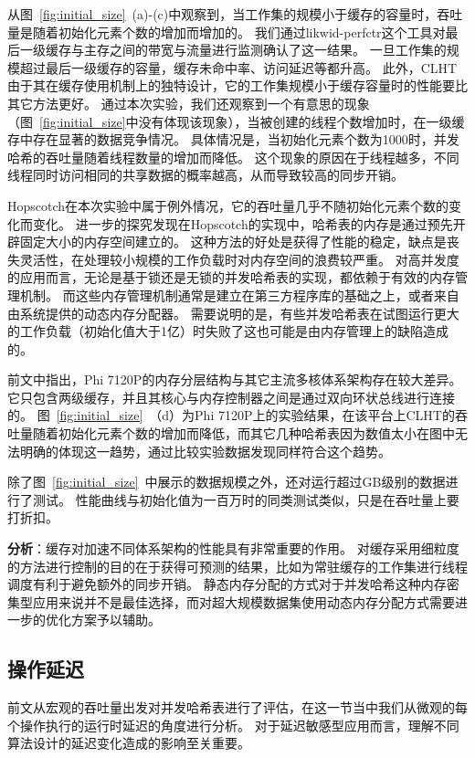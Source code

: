 从图~\ref{fig:initial_size}~(a)-(c)中观察到，当工作集的规模小于缓存的容量时，吞吐量是随着初始化元素个数的增加而增加的。
我们通过likwid-perfctr这个工具对最后一级缓存与主存之间的带宽与流量进行监测确认了这一结果。
一旦工作集的规模超过最后一级缓存的容量，缓存未命中率、访问延迟等都升高。
此外，CLHT由于其在缓存使用机制上的独特设计，它的工作集规模小于缓存容量时的性能要比其它方法更好。
通过本次实验，我们还观察到一个有意思的现象（图~\ref{fig:initial_size}中没有体现该现象），当被创建的线程个数增加时，在一级缓存中存在显著的数据竞争情况。
具体情况是，当初始化元素个数为1000时，并发哈希的吞吐量随着线程数量的增加而降低。
这个现象的原因在于线程越多，不同线程同时访问相同的共享数据的概率越高，从而导致较高的同步开销。

Hopscotch在本次实验中属于例外情况，它的吞吐量几乎不随初始化元素个数的变化而变化。
进一步的探究发现在Hopscotch的实现中，哈希表的内存是通过预先开辟固定大小的内存空间建立的。
这种方法的好处是获得了性能的稳定，缺点是丧失灵活性，在处理较小规模的工作负载时对内存空间的浪费较严重。
对高并发度的应用而言，无论是基于锁还是无锁的并发哈希表的实现，都依赖于有效的内存管理机制。
而这些内存管理机制通常是建立在第三方程序库的基础之上，或者来自由系统提供的动态内存分配器。
需要说明的是，有些并发哈希表在试图运行更大的工作负载（初始化值大于1亿）时失败了这也可能是由内存管理上的缺陷造成的。

前文中指出，Phi 7120P的内存分层结构与其它主流多核体系架构存在较大差异。
它只包含两级缓存，并且其核心与内存控制器之间是通过双向环状总线进行连接的。
图~\ref{fig:initial_size}~（d）为Phi 7120P上的实验结果，在该平台上CLHT的吞吐量随着初始化元素个数的增加而降低，而其它几种哈希表因为数值太小在图中无法明确的体现这一趋势，通过比较实验数据发现同样符合这个趋势。

除了图~\ref{fig:initial_size}~中展示的数据规模之外，还对运行超过GB级别的数据进行了测试。
性能曲线与初始化值为一百万时的同类测试类似，只是在吞吐量上要打折扣。

\textbf{分析}：缓存对加速不同体系架构的性能具有非常重要的作用。
对缓存采用细粒度的方法进行控制的目的在于获得可预测的结果，比如为常驻缓存的工作集进行线程调度有利于避免额外的同步开销。
静态内存分配的方式对于并发哈希这种内存密集型应用来说并不是最佳选择，而对超大规模数据集使用动态内存分配方式需要进一步的优化方案予以辅助。

\subsection{操作延迟}
\label{sec:latency}
前文从宏观的吞吐量出发对并发哈希表进行了评估，在这一节当中我们从微观的每个操作执行的运行时延迟的角度进行分析。
对于延迟敏感型应用而言，理解不同算法设计的延迟变化造成的影响至关重要。

